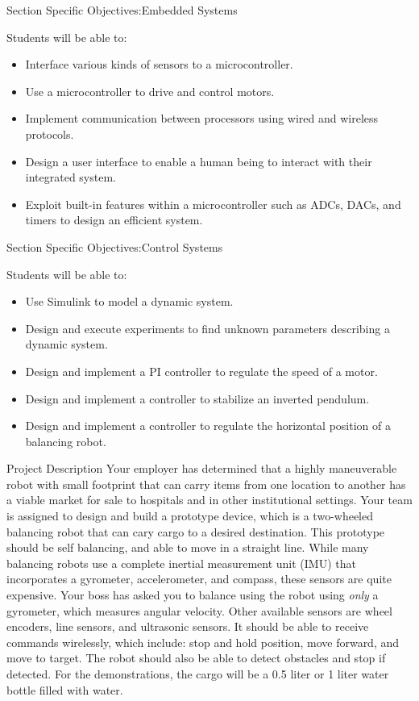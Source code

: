\begin{frame}{Section Specific Objectives:}{Embedded Systems}
\begin{block}{Students will be able to:}
\begin{itemize}
\item  Interface various kinds of sensors to a microcontroller.
\item  Use a microcontroller to drive and control  motors. 
\item  Implement communication between processors using wired and wireless protocols.
\item  Design a user interface to enable a human being to interact with their integrated system.
\item  Exploit built-in features within a microcontroller such as ADCs, DACs, and timers to design an efficient system.
\end{itemize}
\end{block}
\end{frame}


\begin{frame}{Section Specific Objectives:}{Control Systems}
\begin{block}{Students will be able to:}
\begin{itemize}
\item Use Simulink to model a dynamic system.
\item Design and execute experiments to find unknown parameters describing a dynamic system.
\item Design and implement a PI controller to regulate the speed of a motor.
\item Design and implement a controller to stabilize an inverted pendulum.
\item Design and implement a controller to regulate the horizontal position of a balancing robot.
\end{itemize}
\end{block}
\end{frame}

\begin{frame}{Project Description}
Your employer has determined that a highly maneuverable robot with small footprint that can carry items from one location to another has a viable market for sale to hospitals and in other institutional settings. Your team is assigned to design and build a prototype device, which is a two-wheeled balancing robot that can cary cargo to a desired destination. This prototype should be self balancing, and able to move in a straight line. While many balancing robots use a complete inertial measurement unit (IMU) that incorporates a gyrometer, accelerometer, and compass, these sensors are quite expensive. Your boss has asked you to balance using the robot using {\em only} a gyrometer, which measures angular velocity. Other available sensors are wheel encoders, line sensors, and ultrasonic sensors. It should be able to receive commands wirelessly, which include: stop and hold position, move forward, and move to target. The robot should also be able to detect obstacles and stop if detected.  For the demonstrations, the cargo will be a 0.5 liter or 1 liter water bottle filled with water. 
\end{frame}

